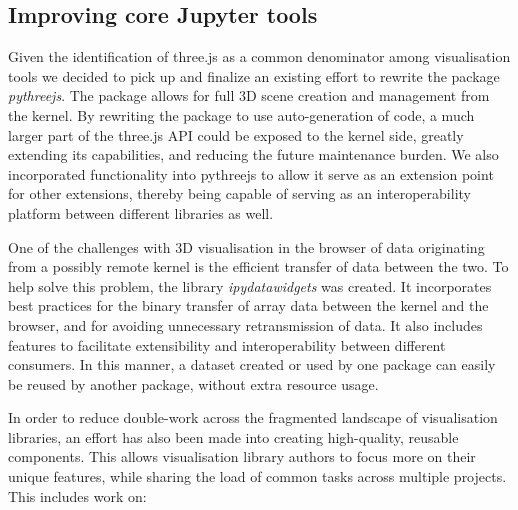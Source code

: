 \documentclass{deliverablereport}
\begin{document}
\subsection{Improving core Jupyter tools}\label{improving-core}


Given the identification of three.js as a common denominator among visualisation tools
we decided to pick up and finalize an existing effort to rewrite the package
\emph{pythreejs}. The package allows for full 3D scene creation and management from the
kernel. By rewriting the package to use auto-generation of code, a much larger
part of the three.js API could be exposed to the kernel side, greatly extending
its capabilities, and reducing the future maintenance burden. We also incorporated
functionality into pythreejs to allow it serve as an extension
point for other extensions, thereby being capable of serving as an interoperability
platform between different libraries as well.


One of the challenges with 3D visualisation in the browser of data originating from
a possibly remote kernel is the efficient transfer of data between the two. To help
solve this problem, the library \emph{ipydatawidgets} was created. It incorporates
best practices for the binary transfer of array data between the kernel and the browser,
and for avoiding unnecessary retransmission of data. It also includes features to
facilitate extensibility and interoperability between different consumers. In this
manner, a dataset created or used by one package can easily be reused by another package,
without extra resource usage.

In order to reduce double-work across the fragmented landscape of visualisation
libraries, an effort has also been made into creating high-quality, reusable
components. This allows visualisation library authors to focus more on their
unique features, while sharing the load of common tasks across multiple projects.
This includes work on:
\end{document}
